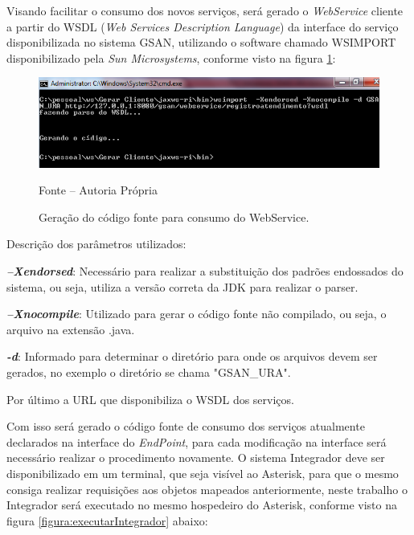Visando facilitar o consumo dos novos serviços, será gerado o \textit{WebService} cliente a partir do WSDL (\textit{Web Services Description Language}) da interface do serviço disponibilizada no sistema GSAN, utilizando o software chamado WSIMPORT disponibilizado pela \textit{Sun Microsystems}, conforme visto na figura \ref{figura:gerarWSCliente}:

\begin{figure}[!htb]
	\centering
	\includegraphics{figuras/gerar_wscliente.png}
	\caption{Geração do código fonte para consumo do WebService.}	
	\label{figura:gerarWSCliente}
	Fonte – Autoria Própria
\end{figure}

Descrição dos parâmetros utilizados:

\begin{description}
	\item \textbf{\textit{–Xendorsed}}: Necessário para realizar a substituição dos padrões endossados do sistema, ou seja, utiliza a versão correta da JDK para realizar o parser.
	\item \textbf{\textit{–Xnocompile}}: Utilizado para gerar o código fonte não compilado, ou seja, o arquivo na extensão .java.
	\item \textbf{\textit{-d}}: Informado para determinar o diretório para onde os arquivos devem ser gerados, no exemplo o diretório se chama "GSAN\_URA".
	\item Por último a URL que disponibiliza o WSDL dos serviços. 
\end{description}



Com isso será gerado o código fonte de consumo dos serviços atualmente declarados na interface do \textit{EndPoint}, para cada modificação na interface será necessário realizar o procedimento novamente. O sistema Integrador deve ser disponibilizado em um terminal, que seja visível ao Asterisk, para que o mesmo consiga realizar requisições aos objetos mapeados anteriormente, neste trabalho o Integrador será executado no mesmo hospedeiro do Asterisk, conforme visto na figura \ref{figura:executarIntegrador} abaixo:

